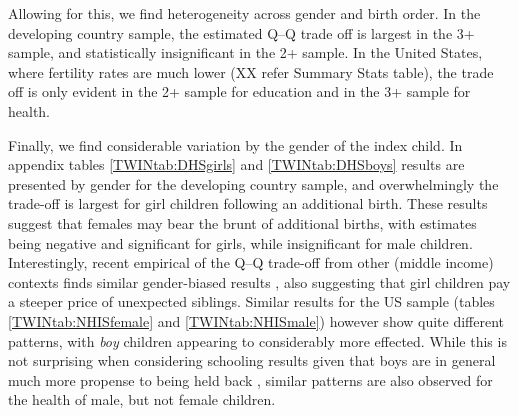 \documentclass[subeqn]{article}
\begin{document}
\begin{spacing}{1.4}
Allowing for this, we find heterogeneity across gender and birth order. %
In the developing country sample, the estimated Q--Q trade off is largest in the 3+ sample, and statistically insignificant in the 2+ sample. In the United States, where fertility rates are much lower (XX refer Summary Stats table), the trade off is only evident in the 2+ sample for education and in the 3+ sample for health.



Finally, we find considerable variation by the gender of the index child.
In appendix tables \ref{TWINtab:DHSgirls} and \ref{TWINtab:DHSboys} results are
presented by gender for the developing country sample, and overwhelmingly the
trade-off is largest for girl children following an additional birth.  These
results suggest that females may bear the brunt of additional births, with
estimates being negative and significant for girls, while insignificant for male
children. Interestingly, recent empirical of the Q--Q trade-off from other (middle
income) contexts finds similar gender-biased results \citep{SouzaPonczek2012},
also suggesting that girl children pay a steeper price of unexpected siblings.
Similar results for the US sample (tables \ref{TWINtab:NHISfemale} and
\ref{TWINtab:NHISmale}) however show quite different patterns, with \emph{boy}
children appearing to considerably more effected. While this is not surprising
when considering schooling results given that boys are in general much more
propense to being held back \citet{Warrenetal2014}, similar patterns are also
observed for the health of male, but not female children.


\end{spacing}
\end{document}
